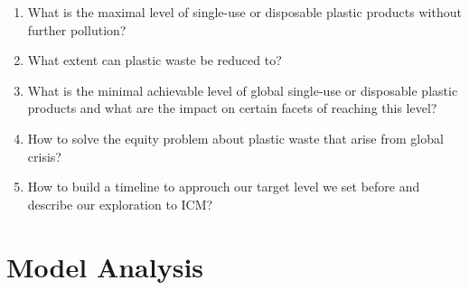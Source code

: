 \documentclass{mcmthesis}
\begin{document}
\begin{enumerate}
	\item What is the maximal level of single-use or disposable plastic products without further pollution?
	\item What extent can plastic waste be reduced to?
	\item What is the minimal achievable level of global single-use or disposable plastic products and what are the impact on certain facets of reaching this level?
	\item How to solve the equity problem about plastic waste that arise from global crisis?
	\item How to build a timeline to approuch our target level we set before and describe our exploration to ICM?
\end{enumerate}

%
%


\section{Model Analysis}
\end{document}

